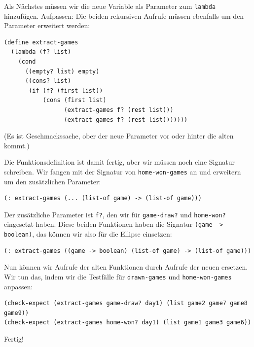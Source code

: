%
Als Nächstes müssen wir die neue Variable als Parameter zum
\lstinline{lambda} hinzufügen.  Aufpassen: Die beiden rekursiven
Aufrufe müssen ebenfalls um den Parameter erweitert werden:
%
\begin{lstlisting}
(define extract-games
  (lambda (f? list)
    (cond
      ((empty? list) empty)
      ((cons? list)
       (if (f? (first list))
           (cons (first list)
                 (extract-games f? (rest list)))
                 (extract-games f? (rest list)))))))
\end{lstlisting}
%
(Es ist Geschmackssache, ober der neue Parameter vor oder hinter die
alten kommt.)

Die Funktionsdefinition ist damit fertig, aber wir müssen noch eine
Signatur schreiben.  Wir fangen mit der Signatur von
\lstinline{home-won-games} an und erweitern um den zusätzlichen
Parameter:
%
\begin{lstlisting}
(: extract-games (... (list-of game) -> (list-of game)))
\end{lstlisting}
%
Der zusätzliche Parameter ist \lstinline{f?}, den wir für
\lstinline{game-draw?} und \lstinline{home-won?} eingesetzt haben.
Diese beiden Funktionen haben die Signatur
\lstinline{(game -> boolean)}, das können wir also für die Ellipse
einsetzen:
%
\begin{lstlisting}
(: extract-games ((game -> boolean) (list-of game) -> (list-of game)))
\end{lstlisting}
%
Nun können wir Aufrufe der alten Funktionen durch Aufrufe der neuen
ersetzen.  Wir tun das, indem wir die Testfälle für
\lstinline{drawn-games} und \lstinline{home-won-games} anpassen:
%
\begin{lstlisting}
(check-expect (extract-games game-draw? day1) (list game2 game7 game8 game9))
(check-expect (extract-games home-won? day1) (list game1 game3 game6))
\end{lstlisting}
%
Fertig!

